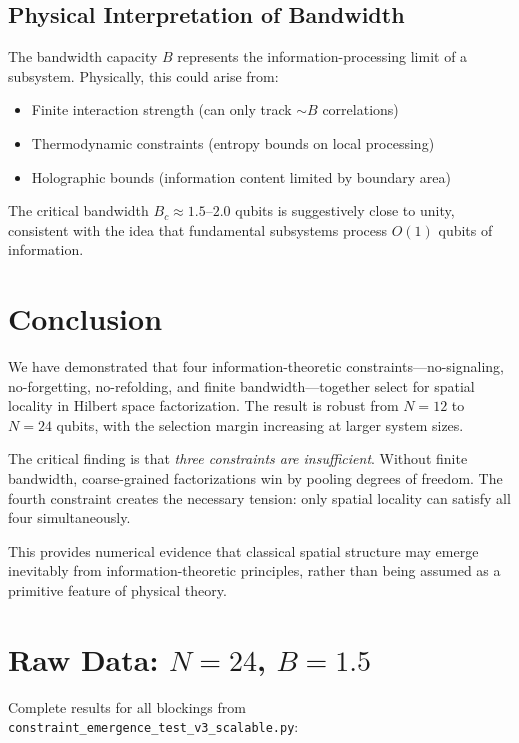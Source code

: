 \documentclass[11pt]{article}
\begin{document}
\subsection{Physical Interpretation of Bandwidth}

The bandwidth capacity $B$ represents the information-processing limit of a 
subsystem. Physically, this could arise from:
\begin{itemize}
    \item Finite interaction strength (can only track $\sim B$ correlations)
    \item Thermodynamic constraints (entropy bounds on local processing)
    \item Holographic bounds (information content limited by boundary area)
\end{itemize}

The critical bandwidth $B_c \approx 1.5$--$2.0$ qubits is suggestively close to 
unity, consistent with the idea that fundamental subsystems process $O(1)$ qubits 
of information.

\section{Conclusion}

We have demonstrated that four information-theoretic constraints---no-signaling, 
no-forgetting, no-refolding, and finite bandwidth---together select for spatial 
locality in Hilbert space factorization. The result is robust from $N=12$ to 
$N=24$ qubits, with the selection margin increasing at larger system sizes.

The critical finding is that \emph{three constraints are insufficient}. Without 
finite bandwidth, coarse-grained factorizations win by pooling degrees of freedom. 
The fourth constraint creates the necessary tension: only spatial locality can 
satisfy all four simultaneously.

This provides numerical evidence that classical spatial structure may emerge 
inevitably from information-theoretic principles, rather than being assumed as a 
primitive feature of physical theory.

\appendix

\section{Raw Data: $N=24$, $B=1.5$}

Complete results for all blockings from \texttt{constraint\_emergence\_test\_v3\_scalable.py}:
\end{document}
